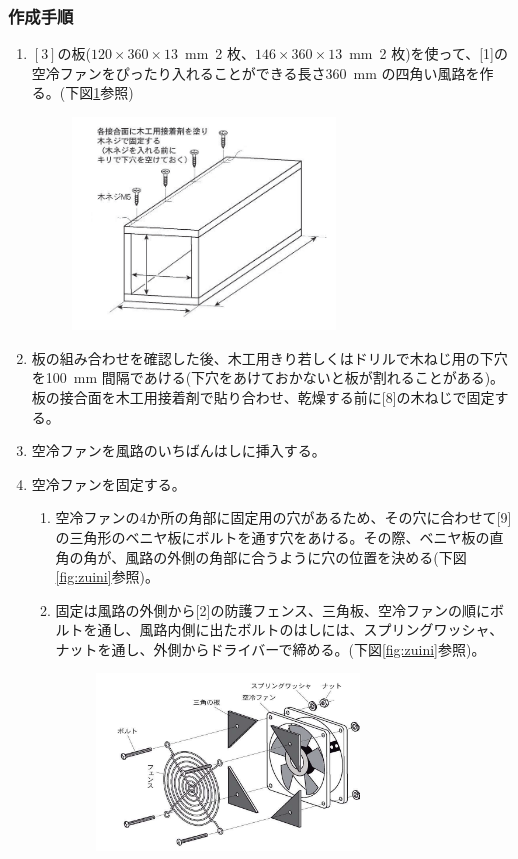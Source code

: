 \documentclass[11pt,b5paper,papersize,dvipdfmx]{jsbook}
\begin{document}
\subsubsection{作成手順}
\begin{enumerate}
\renewcommand{\labelenumi}{\Roman{enumi}).}
\item $[3]$の板($120\times 360\times 13$\ mm\ 2 枚、$146\times 360\times 13$\ mm\ 2 枚)を使って、[1]の空冷ファンをぴったり入れることができる長さ360\ mm の四角い風路を作る。(下図\ref{fig:zuiti}参照)
\begin{figure}[H]
  \centering
  \includegraphics[width=7cm]{saijo2/img/zuiti.PNG}
  \caption{}
  \label{fig:zuiti}
\end{figure}
\item 板の組み合わせを確認した後、木工用きり若しくはドリルで木ねじ用の下穴を100~mm 間隔であける(下穴をあけておかないと板が割れることがある)。板の接合面を木工用接着剤で貼り合わせ、乾燥する前に[8]の木ねじで固定する。
\item 空冷ファンを風路のいちばんはしに挿入する。
\item 空冷ファンを固定する。
  \begin{enumerate}
    \renewcommand{\labelenumii}{\alph{enumii}).}
    \item 空冷ファンの4か所の角部に固定用の穴があるため、その穴に合わせて[9]の三角形のベニヤ板にボルトを通す穴をあける。その際、ベニヤ板の直角の角が、風路の外側の角部に合うように穴の位置を決める(下図\ref{fig:zuini}参照)。
    \item 固定は風路の外側から[2]の防護フェンス、三角板、空冷ファンの順にボルトを通し、風路内側に出たボルトのはしには、スプリングワッシャ、ナットを通し、外側からドライバーで締める。(下図\ref{fig:zuini}参照)。
    \begin{figure}[H]
      \centering
      \includegraphics[width=7cm]{saijo2/img/zuni.PNG}

\end{figure}
\end{enumerate}
\end{enumerate}
\end{document}
